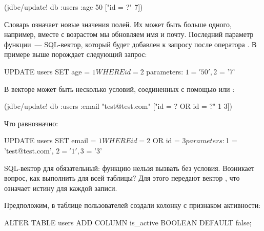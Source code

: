\begin{english}
  \begin{clojure}
(jdbc/update! db :users {:age 50} ["id = ?" 7])
  \end{clojure}
\end{english}

Словарь  означает новые значения полей. Их может быть больше одного, например, вместе с возрастом мы обновляем имя и почту. Последний параметр функции~--- SQL-вектор, который будет добавлен к запросу после оператора . В примере выше  порождает следующий запрос:

\begin{english}
  \begin{sql}
UPDATE users SET age = $1 WHERE id = $2
parameters: $1 = '50', $2 = '7'
  \end{sql}
\end{english}

В векторе может быть несколько условий, соединенных с помощью  или :

\begin{english}
  \begin{clojure}
(jdbc/update! db :users
              {:email "test@test.com"}
              ["id = ? OR id = ?" 1 3])
  \end{clojure}
\end{english}

\noindent
Что равнозначно:

\begin{english}
  \begin{sql}
UPDATE users SET email = $1
WHERE id = $2 OR id = $3
parameters:
  $1 = 'test@test.com', $2 = '1', $3 = '3'
  \end{sql}
\end{english}

SQL-вектор для  обязательный: функцию нельзя вызвать без условия. Возникает вопрос, как выполнить  для всей таблицы? Для этого передают вектор \code{["true"]}, что означает истину для каждой записи.

Предположим, в таблице пользователей создали колонку с признаком активности:

\begin{english}
  \begin{sql}
ALTER TABLE users
ADD COLUMN is_active BOOLEAN DEFAULT false;
  \end{sql}
\end{english}

